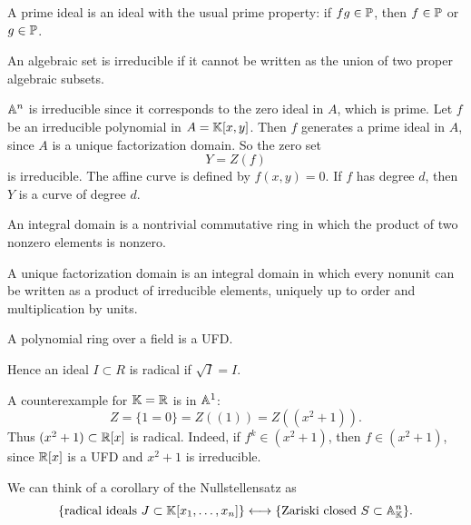 \begin{definition}
    A prime ideal is an ideal with the usual prime property:
    if $fg\in \pp$, then $f\in \pp$ or $g\in \pp$.
\end{definition}

\begin{definition}
    An algebraic set is irreducible if it cannot be written as the union of two proper algebraic subsets.
\end{definition}

$\aa^n$ is irreducible since it corresponds to the zero ideal in $A$, which is prime.
Let $f$ be an irreducible polynomial in $A = \kk[x,y]$.
Then $f$ generates a prime ideal in $A$, since $A$ is a unique factorization domain.
So the zero set
\[
    Y = Z(f)
\]
is irreducible.
The affine curve is defined by $f(x,y) = 0$.
If $f$ has degree $d$, then $Y$ is a curve of degree $d$.

\begin{definition}
    An integral domain is a nontrivial commutative ring in which the product of two nonzero elements is nonzero.
\end{definition}

\begin{definition}
    A unique factorization domain is an integral domain in which every nonunit can be written as a product of irreducible elements, uniquely up to order and multiplication by units.
\end{definition}

\begin{lemma*}{
    A polynomial ring over a field is a UFD.
}
\end{lemma*}

\begin{definition}
    Hence an ideal $I\subset R$ is radical if $\sqrt{I} = I$.
\end{definition}

A counterexample for $\kk = \rr$ is in $\aa^1$:
\[
    Z = \{1 = 0\} = Z((1)) = Z((x^2+1)).
\]
Thus $(x^2+1)\subset \rr[x]$ is radical.
Indeed, if $f^k\in (x^2+1)$, then $f\in (x^2+1)$, since $\rr[x]$ is a UFD and $x^2+1$ is irreducible.

\begin{corollary}{
    We can think of a corollary of the Nullstellensatz as
    \[
        \{\text{radical ideals } J\subset\kk[x_1,\ldots,x_n]\}
        \longleftrightarrow
        \{\text{Zariski closed } S\subset \aa^n_\kk\}.
    \]
}
\end{corollary}